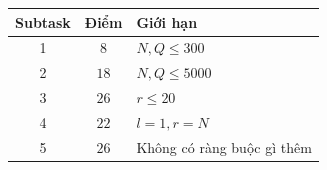 \begin{center}
  \begin{tabular}{|c|c|l|} \hline
    \textbf{Subtask} & \textbf{Điểm} & \textbf{Giới hạn} \\ \hline
    1 & $8$ & $N,Q \leq 300$ \\ \hline
    2 & $18$ & $N,Q\le 5000$ \\ \hline
    3 & $26$ & $r \leq 20$ \\ \hline
    4 & $22$ & $l=1, r=N$ \\ \hline
    5 & $26$ & Không có ràng buộc gì thêm \\ \hline
  \end{tabular}
\end{center}
